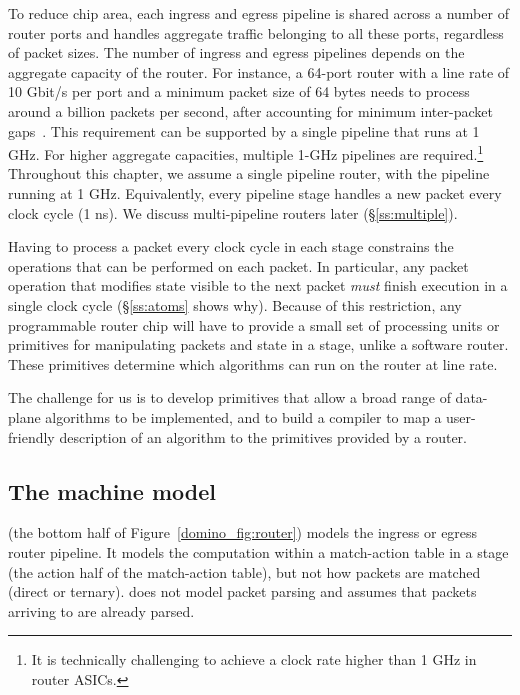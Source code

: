 To reduce chip area, each ingress and egress pipeline is shared across a number
of router ports and handles aggregate traffic belonging to all these ports,
regardless of packet sizes. The number of ingress and egress pipelines depends
on the aggregate capacity of the router. For instance, a 64-port router with a
line rate of 10 Gbit/s per port and a minimum packet size of 64 bytes needs to
process around a billion packets per second, after accounting for minimum
inter-packet gaps~\cite{rmt}.  This requirement can be supported by a single
pipeline that runs at 1 GHz.  For higher aggregate capacities, multiple 1-GHz
pipelines are required.\footnote{It is technically challenging to achieve a
clock rate higher than 1 GHz in router ASICs.} Throughout this chapter, we
assume a single pipeline router, with the pipeline running at 1 GHz.
Equivalently, every pipeline stage handles a new packet every clock cycle (1
ns). We discuss multi-pipeline routers later (\S\ref{ss:multiple}). 

Having to process a packet every clock cycle in each stage constrains the
operations that can be performed on each packet. In particular, any packet
operation that modifies state visible to the next packet {\em must} finish
execution in a single clock cycle (\S\ref{ss:atoms} shows why). Because of this
restriction, any programmable router chip will have to provide a small set of
processing units or primitives for manipulating packets and state in a stage,
unlike a software router. These primitives determine which algorithms can run
on the router at line rate.

The challenge for us is to develop primitives that allow a broad range of
data-plane algorithms to be implemented, and to build a compiler to map a
user-friendly description of an algorithm to the primitives provided by a
router.

\subsection{The \absmachine machine model}

\absmachine (the bottom half of Figure~\ref{domino_fig:router}) models the
ingress or egress router pipeline.  It models the computation within a
match-action table in a stage (\ie the action half of the match-action table),
but not how packets are matched (\eg direct or ternary). \absmachine does not
model packet parsing and assumes that packets arriving to \absmachine are
already parsed.

